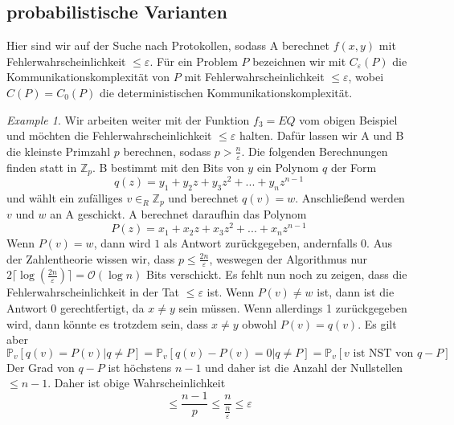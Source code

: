 \documentclass[a4paper, 12pt]{article}
\theoremstyle{plain}
\theoremstyle{definition}
\theoremstyle{lemma}
\theoremstyle{remark}
\theoremstyle{example}
\newtheorem{example}[theorem]{Example}
\begin{document}
	\subsection{probabilistische Varianten}
	Hier sind wir auf der Suche nach Protokollen, sodass A berechnet $f(x,y)$ mit Fehlerwahrscheinlichkeit $\leq \varepsilon$. Für ein Problem $P$ bezeichnen wir mit $C_\varepsilon(P)$ die Kommunikationskomplexität von $P$ mit Fehlerwahrscheinlichkeit $\leq \varepsilon$, wobei $C(P)=C_0(P)$ die deterministischen Kommunikationskomplexität.
	\begin{example}
		Wir arbeiten weiter mit der Funktion $f_3 = EQ$ vom obigen Beispiel und möchten die Fehlerwahrscheinlichkeit $\leq \varepsilon$ halten. Dafür lassen wir A und B die kleinste Primzahl $p$ berechnen, sodass $p>\frac{n}{\varepsilon}$. Die folgenden Berechnungen finden statt in $\mathbb{Z}_p$. B bestimmt mit den Bits von $y$ ein Polynom $q$ der Form \[q(z) = y_1+y_2z+y_3z^2 + ... + y_nz^{n-1}\] und wählt ein zufälliges $v \in_R \mathbb{Z}_p$ und berechnet $q(v) = w$. Anschließend werden $v$ und $w$ an A geschickt. A berechnet daraufhin das Polynom \[P(z) = x_1+x_2z+x_3z^2 + ... + x_nz^{n-1}\] Wenn $P(v) = w$, dann wird $1$ als Antwort zurückgegeben, andernfalls 0. Aus der Zahlentheorie wissen wir, dass $p\leq \frac{2n}{\varepsilon}$, weswegen der Algorithmus nur $2\lceil\log(\frac{2n}{\varepsilon})\rceil = \mathcal{O}(\log n)$ Bits verschickt. Es fehlt nun noch zu zeigen, dass die Fehlerwahrscheinlichkeit in der Tat $\leq \varepsilon$ ist. Wenn $P(v)\neq w$ ist, dann ist die Antwort $0$ gerechtfertigt, da $x\neq y$ sein müssen. Wenn allerdings 1 zurückgegeben wird, dann könnte es trotzdem sein, dass $x\neq y$ obwohl $P(v) = q(v)$. Es gilt aber \[\mathbb{P}_v[q(v)=P(v) | q\neq P] = \mathbb{P}_v[q(v)-P(v)=0|q\neq P] = \mathbb{P}_v[v \text{ ist NST von } q-P]\] Der Grad von $q-P$ ist höchstens $n-1$ und daher ist die Anzahl der Nullstellen $\leq n-1$. Daher ist obige Wahrscheinlichkeit \[\leq \frac{n-1}{p} \leq \frac{n}{\frac{n}{\varepsilon}} \leq \varepsilon\]
	\end{example} 
\end{document}
